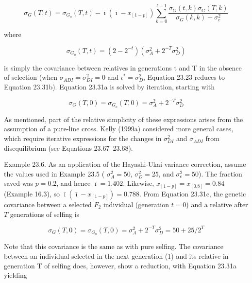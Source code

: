 \documentclass{article}
\begin{document}
\begin{equation}
\sigma_{G}(T,t)=\sigma_{G_{o}}(T,t)-\bar{\imath}(\bar{\imath}-x_{[1-p]})\sum_{k=0}^{t-1}\frac{\sigma_{G}(t,k)\sigma_{G}(T,k)}{\sigma_{G}(k,k)+\sigma_{e}^{2}}
\tag{23.31a}
\label{eq:23_31a}
\end{equation}

where

\begin{equation}
\sigma_{G_{o}}(T,t)=\left(2-2^{-t}\right)\left(\sigma_{A}^{2}+2^{-T}\sigma_{D}^{2}\right)
\tag{23.31b}
\label{eq:23_31b}
\end{equation}

is simply the covariance between relatives in generations t and T in the absence of selection (when  $ \sigma_{ADI} = \sigma_{DI}^2 = 0 $ and  $ \iota^* = \sigma_D^2 $, Equation 23.23 reduces to Equation 23.31b). Equation 23.31a is solved by iteration, starting with

\begin{equation}
\sigma_{G}(T,0)=\sigma_{G_{o}}(T,0)=\sigma_{A}^{2}+2^{-T}\sigma_{D}^{2}
\tag{23.31c}
\label{eq:23_31c}
\end{equation}

As mentioned, part of the relative simplicity of these expressions arises from the assumption of a pure-line cross. Kelly (1999a) considered more general cases, which require iterative expressions for the changes in  $ \sigma_{DI}^{2} $ and  $ \sigma_{ADI} $ from disequilibrium (see Equations 23.67–23.68).

Example 23.6. As an application of the Hayashi-Ukai variance correction, assume the values used in Example 23.5 ( $ \sigma_A^2 = 50 $,  $ \sigma_D^2 = 25 $, and  $ \sigma_e^2 = 50 $). The fraction saved was  $ p = 0.2 $, and hence  $ \bar{\imath} = 1.402 $. Likewise,  $ x_{[1-p]} = x_{[0.8]} = 0.84 $ (Example 16.3), so  $ \bar{\imath}(\bar{\imath} - x_{[1-p]}) = 0.788 $. From Equation 23.31c, the genetic covariance between a selected  $ F_2 $ individual (generation  $ t = 0 $) and a relative after  $ T $ generations of selfing is

\begin{equation}
\sigma_{G}(T,0)=\sigma_{G_{o}}(T,0)=\sigma_{A}^{2}+2^{-T}\sigma_{D}^{2}=50+25/2^{T}
\end{equation}

Note that this covariance is the same as with pure selfing. The covariance between an individual selected in the next generation (1) and its relative in generation T of selfing does, however, show a reduction, with Equation 23.31a yielding
\end{document}
